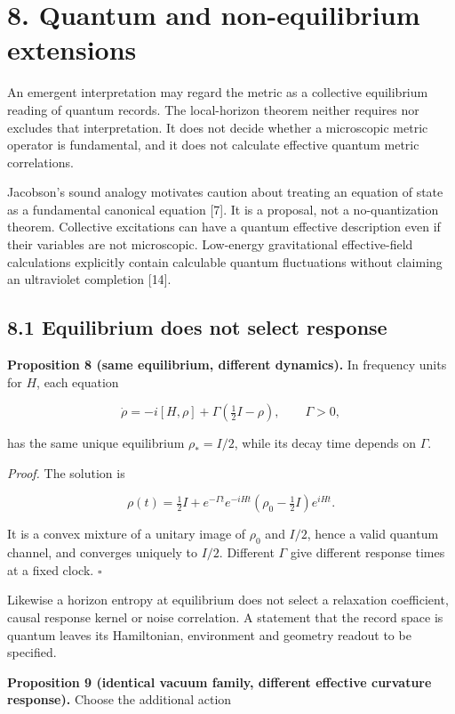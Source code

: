 \documentclass[
  11pt,
  a4paper,
]{article}
\begin{document}
\section{8. Quantum and non-equilibrium extensions}\label{quantum-and-non-equilibrium-extensions}

An emergent interpretation may regard the metric as a collective equilibrium reading of quantum records. The local-horizon theorem neither requires nor excludes that interpretation. It does not decide whether a microscopic metric operator is fundamental, and it does not calculate effective quantum metric correlations.

Jacobson's sound analogy motivates caution about treating an equation of state as a fundamental canonical equation {[}7{]}. It is a proposal, not a no-quantization theorem. Collective excitations can have a quantum effective description even if their variables are not microscopic. Low-energy gravitational effective-field calculations explicitly contain calculable quantum fluctuations without claiming an ultraviolet completion {[}14{]}.

\subsection{8.1 Equilibrium does not select response}\label{equilibrium-does-not-select-response}

\textbf{Proposition 8 (same equilibrium, different dynamics).} In frequency units for \(H\), each equation

\[
\dot\rho=-i[H,\rho]+\Gamma(\tfrac12I-\rho),\qquad\Gamma>0,
\]

has the same unique equilibrium \(\rho_*=I/2\), while its decay time depends on \(\Gamma\).

\emph{Proof.} The solution is

\[
\rho(t)=\tfrac12I+e^{-\Gamma t}e^{-iHt}
(\rho_0-\tfrac12I)e^{iHt}.
\]

It is a convex mixture of a unitary image of \(\rho_0\) and \(I/2\), hence a valid quantum channel, and converges uniquely to \(I/2\). Different \(\Gamma\) give different response times at a fixed clock. \(\square\)

Likewise a horizon entropy at equilibrium does not select a relaxation coefficient, causal response kernel or noise correlation. A statement that the record space is quantum leaves its Hamiltonian, environment and geometry readout to be specified.

\textbf{Proposition 9 (identical vacuum family, different effective curvature response).} Choose the additional action
\end{document}
